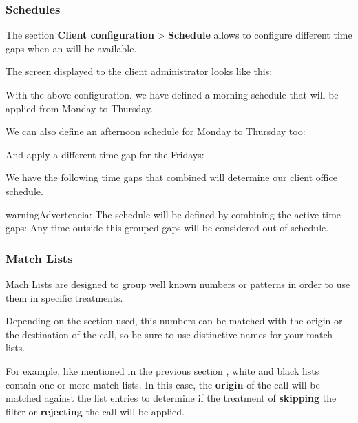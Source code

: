 \documentclass[letterpaper,10pt,spanish]{sphinxmanual}
\begin{document}
\subsubsection{Schedules}
\label{administration_portal/client/vpbx/routing_tools/schedules:id1}\label{administration_portal/client/vpbx/routing_tools/schedules::doc}\label{administration_portal/client/vpbx/routing_tools/schedules:schedules}
The section \textbf{Client configuration} \textgreater{} \textbf{Schedule} allows to configure
different time gaps when an {\hyperref[administration_portal/brand/views/ddis:ddis]{}} will be available.

The screen displayed to the client administrator looks like this:

With the above configuration, we have defined a morning schedule that will be
applied from Monday to Thursday.

We can also define an afternoon schedule for Monday to Thursday too:

And apply a different time gap for the Fridays:

We have the following time gaps that combined will determine our client
office schedule.

\begin{notice}{warning}{Advertencia:}
The schedule will be defined by combining the active time gaps:
Any time outside this grouped gaps will be considered out-of-schedule.
\end{notice}
\label{administration_portal/client/vpbx/routing_tools/match_lists:match-lists}

\subsubsection{Match Lists}
\label{administration_portal/client/vpbx/routing_tools/match_lists:match-lists}\label{administration_portal/client/vpbx/routing_tools/match_lists:id2}\label{administration_portal/client/vpbx/routing_tools/match_lists::doc}\label{administration_portal/client/vpbx/routing_tools/match_lists:id1}
Mach Lists are designed to group well known numbers or patterns in order to use
them in specific treatments.

Depending on the section used, this numbers can be matched with the origin or
the destination of the call, so be sure to use distinctive names for your match
lists.

For example, like mentioned in the previous section {\hyperref[administration_portal/client/vpbx/routing_tools/external_call_filters:external\string-filters]{}},
white and black lists contain one or more match lists. In this case, the
\textbf{origin} of the call will be matched against the list entries to determine if
the treatment of \textbf{skipping} the filter or \textbf{rejecting} the call will be applied.
\end{document}
